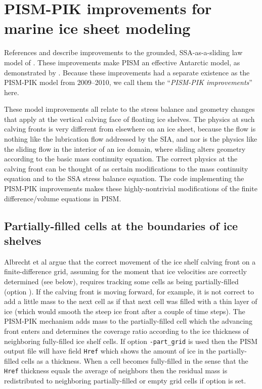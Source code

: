 

\section{PISM-PIK improvements for marine ice sheet modeling}
\label{sec:pism-pik}

References \cite{Albrechtetal2011} and \cite{Winkelmannetal2010TCD} describe improvements to the grounded, SSA-as-a-sliding law model of \cite{BBssasliding}.  These improvements make PISM an effective Antarctic model, as demonstrated by \cite{Martinetal2010TCD,Levermann2011}.  Because these improvements had a separate existence as the PISM-PIK model from 2009--2010, we call them the ``\emph{PISM-PIK improvements}'' here.

These model improvements all relate to the stress balance and geometry changes that apply at the vertical calving face of floating ice shelves.  The physics at such calving fronts is very different from elsewhere on an ice sheet, because the flow is nothing like the lubrication flow addressed by the SIA, and nor is the physics like the sliding flow in the interior of an ice domain, where sliding alters geometry according to the basic mass continuity equation.  The correct physics at the calving front can be thought of as certain modifications to the mass continuity equation and to the SSA stress balance equation.  The code implementing the PISM-PIK improvements makes these highly-nontrivial modifications of the finite difference/volume equations in PISM.

\subsection{Partially-filled cells at the boundaries of ice shelves}
\label{sec:part-grid}

Albrecht et al \cite{Albrechtetal2011} argue that the correct movement of the ice shelf calving front on a finite-difference grid, assuming for the moment that ice velocities are correctly determined (see below), requires tracking some cells as being partially-filled (option ). If the calving front is moving forward, for example, it is not correct to add a little mass to the next cell as if that next cell was filled with a thin layer of ice (which would smooth the steep ice front after a couple of time steps).  The PISM-PIK mechanism adds mass to the partially-filled cell which the advancing front enters and determines the coverage ratio according to the ice thickness of neighboring fully-filled ice shelf cells.  If option \texttt{-part_grid} is used then the PISM output file will have field \texttt{Href} which shows the amount of ice in the partially-filled cells as a thickness.  When a cell becomes fully-filled in the sense that the \texttt{Href} thickness equals the average of neighbors then the residual mass is redistributed to neighboring partially-filled or empty grid cells if option  is set.

